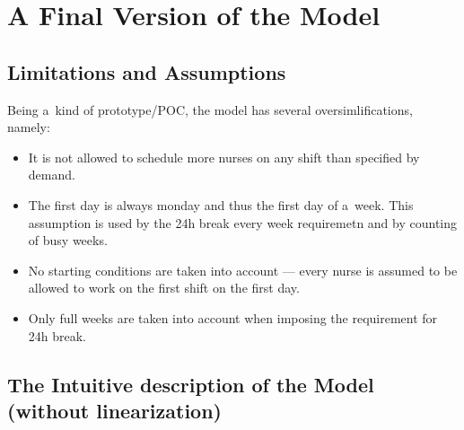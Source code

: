 \section{A Final Version of the Model}


\subsection{Limitations and Assumptions}

Being a~kind of prototype/POC, the model has several oversimlifications, namely:

\begin{itemize}
    \item It is not allowed to schedule more nurses on any shift than specified by demand.
    \item The first day is always monday and thus the first day of a~week. This assumption is used by the 24h break every week requiremetn and by counting of busy weeks.
    \item No starting conditions are taken into account --- every nurse is assumed to be allowed to work on the first shift on the first day.
    \item Only full weeks are taken into account when imposing the requirement for 24h break.
\end{itemize}


\subsection{The Intuitive description of the Model (without linearization)}
\newcommand{\vSchedule}{\texttt{\small vSchedule}}
\newcommand{\vInteraction}{\texttt{\small vInteraction}}
\newcommand{\vWeekendWorkedIndicator}{\texttt{\small vWeekend}}
\newcommand{\vMinWeekendsWorked}{\texttt{\small vMinWeekendsWorked}}
\newcommand{\vMaxWeekendsWorked}{\texttt{\small vMaxWeekendsWorked}}
\newcommand{\pShiftLegth}{\texttt{\small pShiftLegth}}
\newcommand{\pWorkhoursLimit}{\texttt{\small pWorkhoursLimit}}
\newcommand{\vDayLengthBreakIndicator}{\texttt{\small vDayLengthBreakIndicator}}
\newcommand{\pNumerOfNurses}{\texttt{\small pNumerOfNurses}}
\newcommand{\pNumberOfDays}{\texttt{\small pNumberOfDays}}
\newcommand{\pNumberOfShifts}{\texttt{\small pNumberOfShifts}}
\newcommand{\pNumberOfWeeks}{\texttt{\small pNumberOfWeeks}}
\newcommand{\pMaxNightShifts}{\texttt{\small pMaxNightShifts}}
\newcommand{\pDemand}{\texttt{\small pDemand}}
\newcommand{\sNurses}{\texttt{\small sNurses}}
\newcommand{\sDays}{\texttt{\small sDays}}
\newcommand{\sVacations}{\texttt{\small sVacations}}
\newcommand{\sPreferredCompanions}{\texttt{\small sPreferredCompanions}}
\newcommand{\sUnpreferredCompanions}{\texttt{\small sUnpreferredCompanions}}
\newcommand{\sPreferredSlots}{\texttt{\small sPreferredSlots}}
\newcommand{\sUnpreferredSlots}{\texttt{\small sUnpreferredSlots}}
\newcommand{\vAlphaMin}{\texttt{\small vAlphaMin}}
\newcommand{\vAlphaMax}{\texttt{\small vAlphaMax}}

